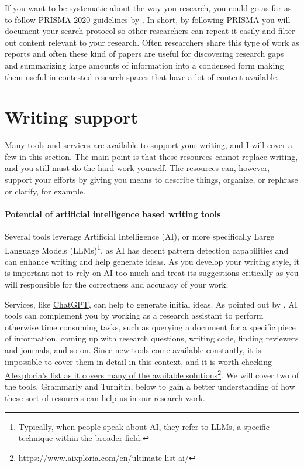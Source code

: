 If you want to be systematic about the way you research, you could go as far as to follow PRISMA 2020 guidelines by \citep{page2021prisma}.
In short, by following PRISMA you will document your search protocol so other researchers can repeat it easily and filter out content relevant to your research.
Often researchers share this type of work as reports and often these kind of papers are useful for discovering research gaps and summarizing large amounts of information into a condensed form making them useful in contested research spaces that have a lot of content available.

\section{Writing support}

Many tools and services are available to support your writing, and I will cover a few in this section.
The main point is that these resources cannot replace writing, and you still must do the hard work yourself.
The resources can, however, support your efforts by giving you means to describe things, organize, or rephrase or clarify, for example.

\paragraph{Potential of artificial intelligence based writing tools}

Several tools leverage Artificial Intelligence (AI), or more specifically Large Language Models (LLMs)\footnote{Typically, when people speak about AI, they refer to LLMs, a specific technique within the broader field.}, as AI has decent pattern detection capabilities and can enhance writing and help generate ideas.
As you develop your writing style, it is important not to rely on AI too much and treat its suggestions critically as you will responsible for the correctness and accuracy of your work.

Services, like \href{https://chatgpt.com/}{ChatGPT}, can help to generate initial ideas.
As pointed out by \citet{lemireLargeLanguage}, AI tools can complement you by working as a research assistant to perform otherwise time consuming tasks, such as querying a document for a specific piece of information, coming up with research questions, writing code, finding reviewers and journals, and so on.
Since new tools come available constantly, it is impossible to cover them in detail in this context, and it is worth checking \href{https://www.aixploria.com/en/ultimate-list-ai/}{AIexploria's list as it covers many of the available solutions}\footnote{\url{https://www.aixploria.com/en/ultimate-list-ai/}}.
We will cover two of the tools, Grammarly and Turnitin, below to gain a better understanding of how these sort of resources can help us in our research work.

